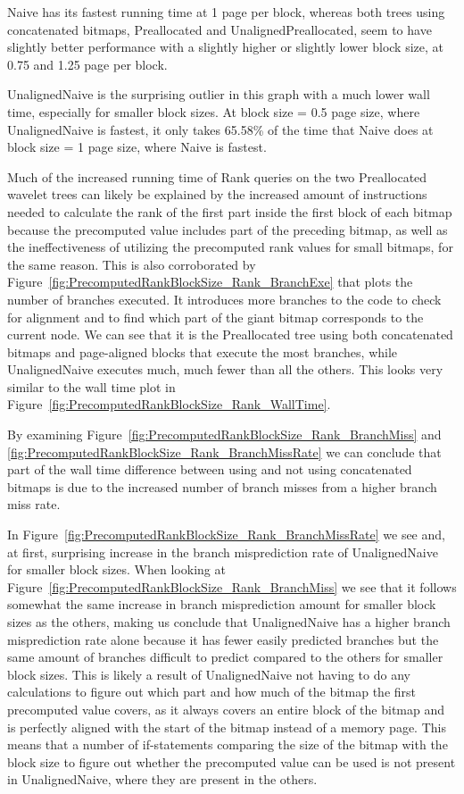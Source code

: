 Naive has its fastest running time at 1 page per block, whereas both trees using concatenated bitmaps, Preallocated and UnalignedPreallocated, seem to have slightly better performance with a slightly higher or slightly lower block size, at 0.75 and 1.25 page per block.

UnalignedNaive is the surprising outlier in this graph with a much lower wall time, especially for smaller block sizes.
At block size = 0.5 page size, where UnalignedNaive is fastest, it only takes 65.58\% of the time that Naive does at block size = 1 page size, where Naive is fastest.

Much of the increased running time of Rank queries on the two Preallocated wavelet trees can likely be explained by the increased amount of instructions needed to calculate the rank of the first part inside the first block of each bitmap because the precomputed value includes part of the preceding bitmap, as well as the ineffectiveness of utilizing the precomputed rank values for small bitmaps, for the same reason.
This is also corroborated by Figure~\ref{fig:PrecomputedRankBlockSize_Rank_BranchExe} that plots the number of branches executed.
It introduces more branches to the code to check for alignment and to find which part of the giant bitmap corresponds to the current node.
We can see that it is the Preallocated tree using both concatenated bitmaps and page-aligned blocks that execute the most branches, while UnalignedNaive executes much, much fewer than all the others.
This looks very similar to the wall time plot in Figure~\ref{fig:PrecomputedRankBlockSize_Rank_WallTime}.

By examining Figure~\ref{fig:PrecomputedRankBlockSize_Rank_BranchMiss} and \ref{fig:PrecomputedRankBlockSize_Rank_BranchMissRate} we can conclude that part of the wall time difference between using and not using concatenated bitmaps is due to the increased number of branch misses from a higher branch miss rate.

In Figure~\ref{fig:PrecomputedRankBlockSize_Rank_BranchMissRate} we see and, at first, surprising increase in the branch misprediction rate of UnalignedNaive for smaller block sizes.
When looking at Figure~\ref{fig:PrecomputedRankBlockSize_Rank_BranchMiss} we see that it follows somewhat the same increase in branch misprediction amount for smaller block sizes as the others, making us conclude that UnalignedNaive has a higher branch misprediction rate alone because it has fewer easily predicted branches but the same amount of branches difficult to predict compared to the others for smaller block sizes.
This is likely a result of UnalignedNaive not having to do any calculations to figure out which part and how much of the bitmap the first precomputed value covers, as it always covers an entire block of the bitmap and is perfectly aligned with the start of the bitmap instead of a memory page.
This means that a number of if-statements comparing the size of the bitmap with the block size to figure out whether the precomputed value can be used is not present in UnalignedNaive, where they are present in the others.

